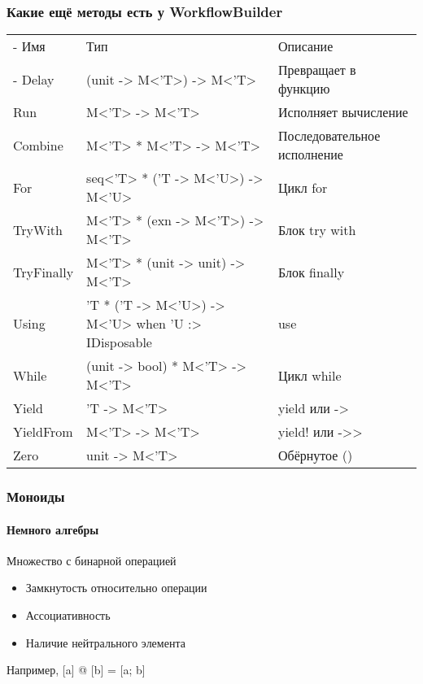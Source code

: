 \documentclass[xetex,mathserif,serif]{beamer}
\begin{document}
	\begin{frame}
		\frametitle{Какие ещё методы есть у WorkflowBuilder}
		\begin{small}
			\begin{tabu} {| X[0.5 l p] | X[1 l p] | X[1 l p] |}
				\tabucline-
				Имя                               & Тип                  & Описание           \\
				\tabucline-
				\everyrow{\tabucline-}
				Delay                    & (unit -> M<'T>) -> M<'T>  & Превращает в функцию   \\
				Run                      & M<'T> -> M<'T>  & Исполняет вычисление   \\
				Combine                   & M<'T> * M<'T> -> M<'T>  & Последовательное исполнение\\
				For                   & seq<'T> * ('T -> M<'U>) -> M<'U>  & Цикл for \\

				TryWith                   & M<'T> * (exn -> M<'T>) -> M<'T>  & Блок try with \\
				TryFinally            & M<'T> * (unit -> unit) -> M<'T>  & Блок finally \\
				Using                   & 'T * ('T -> M<'U>) -> M<'U> when 'U :> IDisposable  & use \\
				While                   & (unit -> bool) * M<'T> -> M<'T>  & Цикл while \\
				Yield                   & 'T -> M<'T>  & yield или -> \\
				YieldFrom                   & M<'T> -> M<'T>  & yield! или ->> \\
				Zero                   & unit -> M<'T>  & Обёрнутое () \\
   			\end{tabu}
		\end{small}
	\end{frame}

	\begin{frame}
		\frametitle{Моноиды}
		\framesubtitle{Немного алгебры}
		Множество с бинарной операцией
		\begin{itemize}
    		\item Замкнутость относительно операции
    		\item Ассоциативность
    		\item Наличие нейтрального элемента
		\end{itemize}
		Например, [a] @ [b] = [a; b]
    \end{frame}
\end{document}
